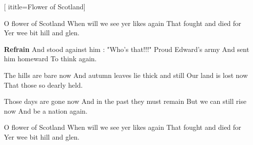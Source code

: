  [
ititle={Flower of Scotland}]

\beginverse
O flower of Scotland
When will we see yer likes again
That fought and died for
Yer wee bit hill and glen.
\endverse

\beginchorus
\textbf{Refrain}
And stood against him :
"Who's that!!!"
Proud Edward's army
And sent him homeward
To think again.
\endchorus

\beginverse
The hills are bare now
And autumn leaves lie thick and still
Our land is lost now
That those so dearly held.
\endverse

\beginverse
Those days are gone now
And in the past they must remain
But we can still rise now
And be a nation again.
\endverse

\beginverse
O flower of Scotland
When will we see yer likes again
That fought and died for
Yer wee bit hill and glen.
\endverse
\endsong